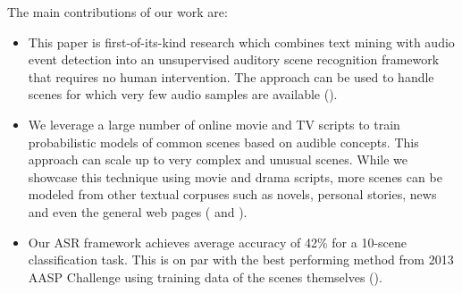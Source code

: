 The main contributions of our work are:
\begin{itemize}
\item This paper is first-of-its-kind research which combines text mining with
audio event detection into an unsupervised auditory scene recognition 
framework that requires no human intervention. The approach can be used to
handle scenes for which very few audio samples are available 
().
\item We leverage a large number of online movie and TV scripts to 
train probabilistic models of common scenes based on audible concepts.
This approach can scale up to very complex and unusual scenes. While
we showcase this technique using movie and drama scripts, more scenes
can be modeled from other textual corpuses such as novels, personal stories,
news and even the general web pages 
( and ).
\item Our ASR framework achieves average accuracy of 42\% for
a 10-scene classification task. 
This is on par with the best performing method from 2013 AASP Challenge 
using training data of the scenes themselves (). 
\end{itemize}


